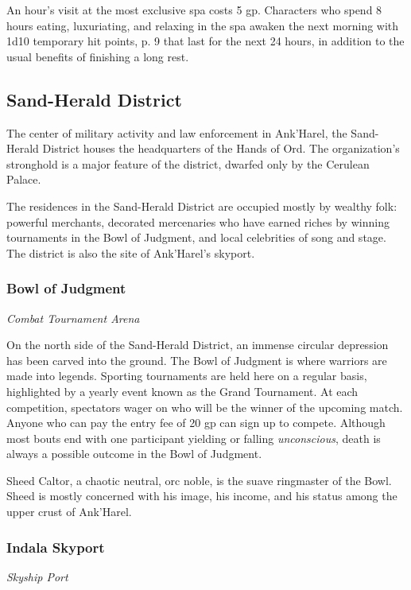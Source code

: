 \documentclass[a4paper, 11pt, bg=full, twocolumn, nooutline]{dndbook}
\begin{document}
An hour's visit at the most exclusive spa costs 5 gp. Characters who spend 8 hours eating, luxuriating, and relaxing in the spa awaken the next morning with 1d10 temporary hit points, p. 9 that last for the next 24 hours, in addition to the usual benefits of finishing a long rest.

\subsection{Sand-Herald District}

The center of military activity and law enforcement in Ank'Harel, the Sand-Herald District houses the headquarters of the Hands of Ord. The organization's stronghold is a major feature of the district, dwarfed only by the Cerulean Palace.

The residences in the Sand-Herald District are occupied mostly by wealthy folk: powerful merchants, decorated mercenaries who have earned riches by winning tournaments in the Bowl of Judgment, and local celebrities of song and stage. The district is also the site of Ank'Harel's skyport.

\subsubsection{Bowl of Judgment}

\textit{Combat Tournament Arena}

On the north side of the Sand-Herald District, an immense circular depression has been carved into the ground. The Bowl of Judgment is where warriors are made into legends. Sporting tournaments are held here on a regular basis, highlighted by a yearly event known as the Grand Tournament. At each competition, spectators wager on who will be the winner of the upcoming match. Anyone who can pay the entry fee of 20 gp can sign up to compete. Although most bouts end with one participant yielding or falling \textit{unconscious}, death is always a possible outcome in the Bowl of Judgment.

Sheed Caltor, a chaotic neutral, orc noble, is the suave ringmaster of the Bowl. Sheed is mostly concerned with his image, his income, and his status among the upper crust of Ank'Harel.

\subsubsection{Indala Skyport}

\textit{Skyship Port}
\end{document}
